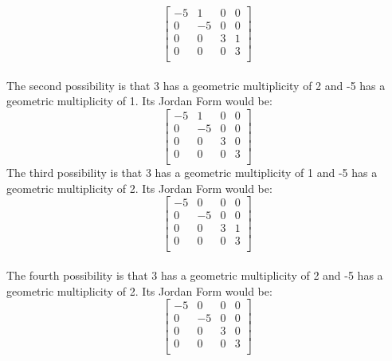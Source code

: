 \documentclass[letterpaper,12pt]{article}
\theoremstyle{definition}
\begin{document}
\[\begin{bmatrix}
   -5 & 1 & 0 & 0\\
   0 & -5 & 0 & 0\\
   0 & 0 & 3 & 1\\
   0 & 0 & 0 & 3\\
  \end{bmatrix}\]\\
The second possibility is that 3 has a geometric multiplicity of 2 and -5 has a geometric multiplicity of 1. Its Jordan Form would be:
\[\begin{bmatrix}
   -5 & 1 & 0 & 0\\
   0 & -5 & 0 & 0\\
   0 & 0 & 3 & 0\\
   0 & 0 & 0 & 3\\
  \end{bmatrix}\]
The third possibility is that 3 has a geometric multiplicity of 1 and -5 has a geometric multiplicity of 2. Its Jordan Form would be:
\[\begin{bmatrix}
   -5 & 0 & 0 & 0\\
   0 & -5 & 0 & 0\\
   0 & 0 & 3 & 1\\
   0 & 0 & 0 & 3\\
  \end{bmatrix}\]\\
The fourth possibility is that 3 has a geometric multiplicity of 2 and -5 has a geometric multiplicity of 2. Its Jordan Form would be:\\
\[\begin{bmatrix}
   -5 & 0 & 0 & 0\\
   0 & -5 & 0 & 0\\
   0 & 0 & 3 & 0\\
   0 & 0 & 0 & 3\\
  \end{bmatrix}\]\\
\end{document}

